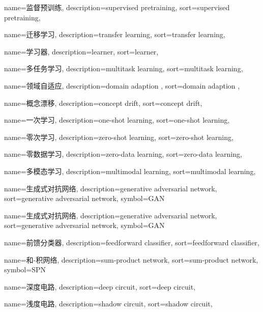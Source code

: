 {
  name=监督预训练,
  description={supervised pretraining},
  sort={supervised pretraining},
}

{
  name=迁移学习,
  description={transfer learning},
  sort={transfer learning},
}

{
  name=学习器,
  description={learner},
  sort={learner},
}

{
  name=多任务学习,
  description={multitask learning},
  sort={multitask learning},
}

{
  name=领域自适应,
  description={domain adaption}  ,
  sort={domain adaption}  ,
}

{
  name=概念漂移,
  description={concept drift},
  sort={concept drift},
}

{
  name=一次学习,
  description={one-shot learning},
  sort={one-shot learning},
}

{
  name=零次学习,
  description={zero-shot learning},
  sort={zero-shot learning},
}

{
  name=零数据学习,
  description={zero-data learning},
  sort={zero-data learning},
}

{
  name=多模态学习,
  description={multimodal learning},
  sort={multimodal learning},
}

{
  name=生成式对抗网络,
  description={generative adversarial network},
  sort={generative adversarial network},
  symbol={GAN}
}

{
  name=生成式对抗网络,
  description={generative adversarial network},
  sort={generative adversarial network},
  symbol={GAN}
}

{
  name=前馈分类器,
  description={feedforward classifier},
  sort={feedforward classifier},
}

{
   name=和-积网络,
   description={sum-product network},
   sort={sum-product network},
   symbol={SPN}
}

{
  name=深度电路,
  description={deep circuit},
  sort={deep circuit},
}

{
  name=浅度电路,
  description={shadow circuit},
  sort={shadow circuit},
}

